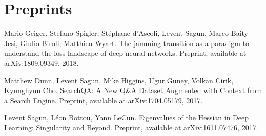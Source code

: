 \documentclass[10pt,letterpaper]{article}
\renewenvironment{itemize}
{
\begin{list}{}{\setlength{\leftmargin}{1.5em}}
}
{
  \end{list}
}
\begin{document}
\section*{Preprints}
\begin{itemize}

\item Mario Geiger, Stefano Spigler, St\'ephane d'Ascoli, Levent Sagun, Marco Baity-Jesi, Giulio Biroli, Matthieu Wyart. The jamming transition as a paradigm to understand the loss landscape of deep neural networks. Preprint, available at arXiv:1809.09349, 2018.

\item Matthew Dunn, Levent Sagun, Mike Higgins, Ugur Guney, Volkan Cirik, Kyunghyun Cho. SearchQA: A New Q\&A Dataset Augmented with Context from a Search Engine. Preprint, available at arXiv:1704.05179, 2017.

\item Levent Sagun, L\'eon Bottou, Yann LeCun. Eigenvalues of the Hessian in Deep Learning: Singularity and Beyond. Preprint, available at arXiv:1611.07476, 2017.
\end{itemize}

\end{document}
